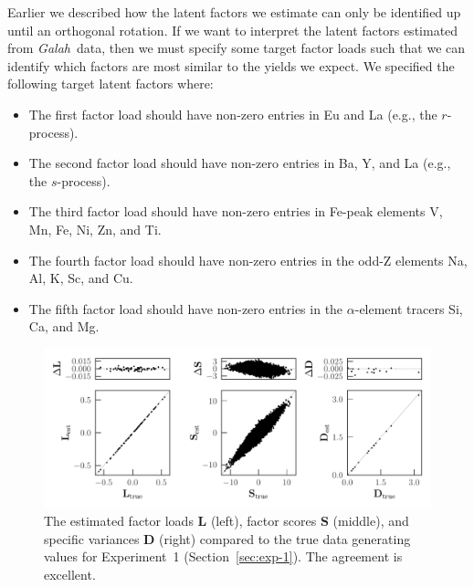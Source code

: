 \documentclass[twocolumn]{aastex62}
\newcommand{\project}[1]{\textsl{#1}}
\newcommand{\Galah}{\project{Galah}}
\newcommand{\vect}[1]{\boldsymbol{\mathbf{#1}}}
\renewcommand{\vec}[1]{\vect{#1}}
\newcommand{\factorloads}{\textbf{L}}
\newcommand{\factorscores}{\textbf{S}}
\newcommand{\specificvariance}{\vec{D}}
\begin{document}
Earlier we described how the latent factors we estimate can only be identified up until an orthogonal rotation. If we want to interpret the latent factors estimated from \Galah\ data, then we must specify
some target factor loads such that we can identify which factors are most similar to the yields we expect.
We specified the following target latent factors where:
\begin{itemize}
	\item The first factor load should have non-zero entries in Eu and La (e.g., the $r$-process).
	\item The second factor load should have non-zero entries in Ba, Y, and La (e.g., the $s$-process).
	\item The third factor load should have non-zero entries in Fe-peak elements V, Mn, Fe, Ni, Zn, and Ti.
	\item The fourth factor load should have non-zero entries in the odd-Z elements Na, Al, K, Sc, and Cu.
	\item The fifth factor load should have non-zero entries in the $\alpha$-element tracers Si, Ca, and Mg.
\end{itemize}

\begin{figure}[t!]
	\includegraphics[width=\textwidth]{experiments/eval-figs/eval-1-compare-all.pdf}
	\caption{The estimated factor loads $\factorloads$ (left), factor scores $\factorscores$ (middle),
    		 and specific variances $\specificvariance$ (right) compared to the 
		 	 true data generating values
		 	 for Experiment~1 (Section~\ref{sec:exp-1}). The agreement is excellent.}
    \label{fig:exp1-compare}
\end{figure}
\end{document}
